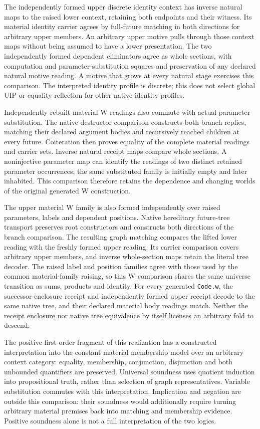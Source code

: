 \documentclass[11pt]{article}
\theoremstyle{definition}
\theoremstyle{remark}
\begin{document}
The independently formed upper discrete identity context has inverse natural
maps to the raised lower context, retaining both endpoints and their witness.
Its material identity carrier agrees by full-future matching in both directions
for arbitrary upper members.  An arbitrary upper motive pulls through those
context maps without being assumed to have a lower presentation.  The two
independently formed dependent eliminators agree as whole sections, with
computation and parameter-substitution squares and preservation of any declared
natural motive reading.  A motive that grows at every natural stage exercises
this comparison.  The interpreted identity profile is discrete; this does not
select global UIP or equality reflection for other native identity profiles.

Independently rebuilt material W readings also commute with actual parameter
substitution.  The native destructor comparison constructs both branch replies,
matching their declared argument bodies and recursively reached children at
every future.  Coiteration then proves equality of the complete material
readings and carrier sets.  Inverse natural receipt maps compare whole sections.
A noninjective parameter map can identify the readings of two distinct retained
parameter occurrences; the same substituted family is initially empty and
later inhabited.  This comparison therefore retains the dependence and changing
worlds of the original generated W construction.

The upper material W family is also formed independently over raised
parameters, labels and dependent positions.  Native hereditary future-tree
transport preserves root constructors and constructs both directions of the
branch comparison.  The resulting graph matching compares the lifted lower
reading with the freshly formed upper reading.  Its carrier comparison covers
arbitrary upper members, and inverse whole-section maps retain the literal
tree decoder.  The raised label and position families agree with those used
by the common material-family raising, so this W comparison shares the same
universe transition as sums, products and identity.  For every generated
\nolinkurl{Code.w}, the successor-enclosure receipt and independently formed
upper receipt decode to the same native tree, and their declared material
body readings match.  Neither the receipt enclosure nor native tree
equivalence by itself licenses an arbitrary fold to descend.

The positive first-order fragment of this realization has a constructed
interpretation into the constant material membership model over an
arbitrary context category: equality, membership, conjunction,
disjunction and both unbounded quantifiers are preserved.  Universal
soundness uses quotient induction into propositional truth, rather than
selection of graph representatives.  Variable substitution commutes
with this interpretation.  Implication and negation are outside this
comparison: their soundness would additionally require turning arbitrary
material premises back into matching and membership evidence.  Positive
soundness alone is not a full interpretation of the two logics.
\end{document}
